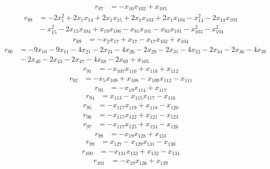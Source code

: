 \[\begin{aligned}
r_{87}&=-x_{16}x_{102}+x_{103}
\end{aligned}\]
\[\begin{aligned}
r_{88}&=-2x_{1}^{2}+2x_{1}x_{14}+2x_{1}x_{15}+2x_{1}x_{103}+2x_{1}x_{104}-x_{14}^{2}-2x_{14}x_{103}\\
&{}-x_{15}^{2}-2x_{15}x_{104}+x_{19}x_{106}-x_{81}x_{101}-x_{83}x_{101}-x_{103}^{2}-x_{104}^{2}
\end{aligned}\]
\[\begin{aligned}
r_{89}&=-x_{2}x_{17}+x_{17}-x_{17}x_{102}+x_{104}
\end{aligned}\]
\[\begin{aligned}
r_{90}&=-9x_{10}-9x_{11}-4x_{21}-2x_{24}-4x_{26}-2x_{29}-2x_{31}-4x_{32}-2x_{34}-2x_{36}-4x_{39}\\
&{}-2x_{40}-2x_{43}-2x_{47}-4x_{68}-2x_{69}+x_{105}
\end{aligned}\]
\[\begin{aligned}
r_{91}&=-x_{107}x_{110}+x_{110}+x_{112}
\end{aligned}\]
\[\begin{aligned}
r_{92}&=-x_{5}x_{109}+x_{108}-x_{109}x_{112}-x_{111}
\end{aligned}\]
\[\begin{aligned}
r_{93}&=-x_{19}x_{114}+x_{117}
\end{aligned}\]
\[\begin{aligned}
r_{94}&=x_{113}-x_{115}x_{117}-x_{116}
\end{aligned}\]
\[\begin{aligned}
r_{95}&=-x_{117}x_{119}+x_{118}-x_{120}
\end{aligned}\]
\[\begin{aligned}
r_{96}&=-x_{117}x_{122}+x_{121}-x_{123}
\end{aligned}\]
\[\begin{aligned}
r_{97}&=-x_{117}x_{125}+x_{124}-x_{126}
\end{aligned}\]
\[\begin{aligned}
r_{98}&=-x_{19}x_{128}+x_{131}
\end{aligned}\]
\[\begin{aligned}
r_{99}&=x_{127}-x_{129}x_{131}-x_{130}
\end{aligned}\]
\[\begin{aligned}
r_{100}&=-x_{131}x_{133}+x_{132}-x_{134}
\end{aligned}\]
\[\begin{aligned}
r_{101}&=-x_{19}x_{136}+x_{139}
\end{aligned}\]
